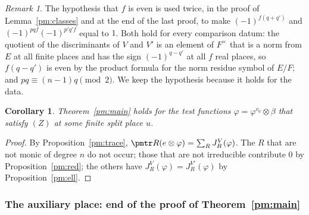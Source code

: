 \documentclass[10pt]{amsart}
\newtheorem{corollary}[theorem]{Corollary}
\theoremstyle{definition}
\theoremstyle{remark}
\newtheorem{remark}[theorem]{Remark}
\begin{document}
\begin{remark}\label{pm:rem-even}
The hypothesis that $f$ is even is used twice, in the proof of Lemma~\ref{pm:classes} and at the
end of the last proof, to make $(-1)^{f(q+q')}$ and $(-1)^{pqf}(-1)^{p'q'f}$ equal to $1$. Both hold
for every comparison datum: the quotient of the discriminants of $V$ and $V'$ is an element of
$F^\times$ that is a norm from $E$ at all finite places and has the sign $(-1)^{q-q'}$ at all
$f$ real places, so $f(q-q')$ is even by the product formula for the norm residue symbol of
$E/F$; and $pq\equiv(n-1)q\pmod 2$. We keep the hypothesis because it holds for the data.
\end{remark}

\begin{corollary}\label{pm:simple}
Theorem~\ref{pm:main} holds for the test functions $\varphi=\varphi^{v_0}\otimes\beta$ that
satisfy $(Z)$ at some finite split place $u$.
\end{corollary}
\begin{proof}
By Proposition~\ref{pm:trace}, $\pmtr R(e\otimes\varphi)=\sum_RJ_R^V(\varphi)$. The $R$ that are
not monic of degree $n$ do not occur; those that are not irreducible contribute $0$ by
Proposition~\ref{pm:red}; the others have $J^V_R(\varphi)=J^{V'}_R(\varphi)$ by
Proposition~\ref{pm:ell}.
\end{proof}

\subsubsection{The auxiliary place: end of the proof of Theorem~\ref{pm:main}}\label{pm:ss-aux}
\end{document}
